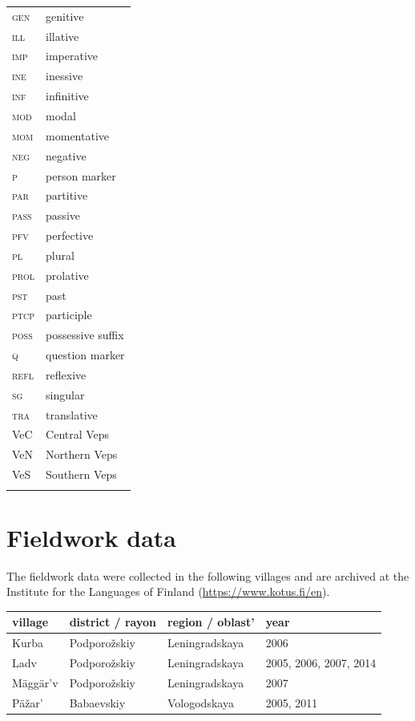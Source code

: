 \documentclass[output=paper,colorlinks=true, citecolor=brown]{langscibook}
\begin{document}
\begin{tabularx}{.45\textwidth}{lQ}
{\scshape gen} & genitive\\
{\scshape ill} & illative\\
{\scshape imp} & imperative\\
{\scshape ine} & inessive\\
{\scshape inf} & infinitive\\
{\scshape mod} & modal\\
{\scshape mom} & momentative\\
{\scshape neg} & negative\\
{\scshape p} & person marker\\
{\scshape par} & partitive\\
{\scshape pass} & passive\\
{\scshape pfv} & perfective\\
{\scshape pl} & plural\\
{\scshape prol} & prolative\\
{\scshape pst} & past\\
{\scshape ptcp} & participle\\
{\scshape poss} & possessive suffix\\
{\scshape q} & question marker\\
{\scshape refl} & reflexive\\
{\scshape sg} & singular\\
{\scshape tra} & translative\\
{VeC} & Central Veps\\
{VeN} & Northern Veps\\
{VeS} & Southern Veps\\
\\
\end{tabularx}

\section*{Fieldwork data}
The fieldwork data were collected in the following villages and are archived at the Institute for the Languages of Finland (\href{https://www.kotus.fi/en}{https://www.kotus.fi/en}).
\medskip

\noindent
\begin{tabularx}{\textwidth}{lllX}
village & district / rayon & region / oblast' & year \\
\midrule
Kurba & Podporožskiy  & Leningradskaya  & 2006 \\
Ladv & Podporožskiy  & Leningradskaya  & 2005, 2006, 2007, 2014 \\
Mäggär’v & Podporožskiy  & Leningradskaya  & 2007 \\
Päžar’ & Babaevskiy  & Vologodskaya  & 2005, 2011 \\
\end{tabularx}


\sloppy\printbibliography[heading=subbibliography,notkeyword=this]
\end{document}
